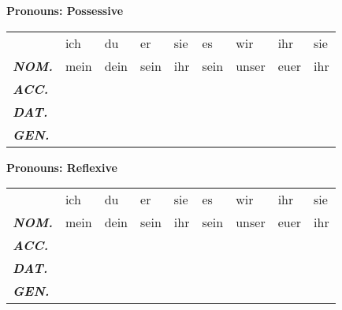 \documentclass[a4paper,twocolumn,10pt]{article}
\newcommand{\tabularxtable}[3]
{

	\vspace{0.5cm}
	\nolinenumbers

	\begin{tabularx}{#1}{#2}
		#3
	\end{tabularx}

	\linenumbers
	\vspace{0.5cm}
}
\begin{document}
\textbf {Pronouns: Possessive}
\tabularxtable
{0.99\linewidth}
{l|XXXXXXXX}
{

		&
		\cellcolor{table-subtopic}  ich                   &
		\cellcolor{table-subtopic}  du                    &
		\cellcolor{table-subtopic}  er                    &
		\cellcolor{table-subtopic}  sie                   &
		\cellcolor{table-subtopic}  es                    &
		\cellcolor{table-subtopic}  wir                   &
		\cellcolor{table-subtopic}  ihr                   &
		\cellcolor{table-subtopic}  sie \\

		\cellcolor{table-subtopic} \textbf{\textit{NOM.}} &
		\cellcolor{white}  mein                            &
		\cellcolor{white}  dein                             &
		\cellcolor{white}  sein                             &
		\cellcolor{white}  ihr                            &
		\cellcolor{white}  sein                             &
		\cellcolor{white}  unser                            &
		\cellcolor{white}  euer                            &
		\cellcolor{white}  ihr \\

		\cellcolor{table-subtopic} \textbf{\textit{ACC.}} & \\

		\cellcolor{table-subtopic} \textbf{\textit{DAT.}} & \\
		\cellcolor{table-subtopic} \textbf{\textit{GEN.}} & \\

}



\textbf {Pronouns: Reflexive}
\tabularxtable
{0.99\linewidth}
{l|XXXXXXXX}
{

		&
		\cellcolor{table-subtopic}  ich                   &
		\cellcolor{table-subtopic}  du                    &
		\cellcolor{table-subtopic}  er                    &
		\cellcolor{table-subtopic}  sie                   &
		\cellcolor{table-subtopic}  es                    &
		\cellcolor{table-subtopic}  wir                   &
		\cellcolor{table-subtopic}  ihr                   &
		\cellcolor{table-subtopic}  sie \\

		\cellcolor{table-subtopic} \textbf{\textit{NOM.}} &
		\cellcolor{white}  mein                           &
		\cellcolor{white}  dein                           &
		\cellcolor{white}  sein                           &
		\cellcolor{white}  ihr                            &
		\cellcolor{white}  sein                           &
		\cellcolor{white}  unser                          &
		\cellcolor{white}  euer                           &
		\cellcolor{white}  ihr \\

		\cellcolor{table-subtopic} \textbf{\textit{ACC.}} & \\
		\cellcolor{table-subtopic} \textbf{\textit{DAT.}} & \\
		\cellcolor{table-subtopic} \textbf{\textit{GEN.}} & \\

}
\end{document}
